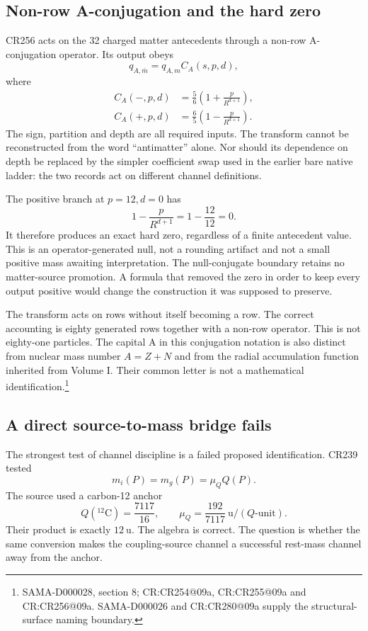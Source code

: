 \subsection{Non-row A-conjugation and the hard zero}

CR256 acts on the 32 charged matter antecedents through a non-row A-conjugation operator. Its output obeys
\begin{equation}
q_{A,\bar m}=q_{A,m}C_A(s,p,d),
\end{equation}
where
\begin{align}
C_A(-,p,d)&=\frac56\left(1+\frac{p}{R^{d+1}}\right),\\
C_A(+,p,d)&=\frac65\left(1-\frac{p}{R^{d+1}}\right).
\label{v2c3:conjugation}
\end{align}
The sign, partition and depth are all required inputs. The transform cannot be reconstructed from the word ``antimatter'' alone. Nor should its dependence on depth be replaced by the simpler coefficient swap used in the earlier bare native ladder: the two records act on different channel definitions.

The positive branch at $p=12,d=0$ has
\begin{equation}
1-\frac{p}{R^{d+1}}=1-\frac{12}{12}=0.
\end{equation}
It therefore produces an exact hard zero, regardless of a finite antecedent value. This is an operator-generated null, not a rounding artifact and not a small positive mass awaiting interpretation. The null-conjugate boundary retains no matter-source promotion. A formula that removed the zero in order to keep every output positive would change the construction it was supposed to preserve.

The transform acts on rows without itself becoming a row. The correct accounting is eighty generated rows together with a non-row operator. This is not eighty-one particles. The capital A in this conjugation notation is also distinct from nuclear mass number $A=Z+N$ and from the radial accumulation function inherited from Volume I. Their common letter is not a mathematical identification.\footnote{SAMA-D000028, section 8; CR:CR254@09a, CR:CR255@09a and CR:CR256@09a. SAMA-D000026 and CR:CR280@09a supply the structural-surface naming boundary.}

\subsection{A direct source-to-mass bridge fails}

The strongest test of channel discipline is a failed proposed identification. CR239 tested
\begin{equation}
m_i(P)=m_g(P)=\mu_Q Q(P).
\label{v2c3:failedbridge}
\end{equation}
The source used a carbon-12 anchor
\begin{equation}
Q({}^{12}\mathrm C)=\frac{7117}{16},\qquad
\mu_Q=\frac{192}{7117}\ \mathrm{u}/(Q\text{-unit}).
\end{equation}
Their product is exactly $12\ \mathrm u$. The algebra is correct. The question is whether the same conversion makes the coupling-source channel a successful rest-mass channel away from the anchor.

